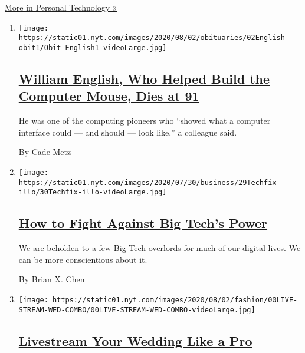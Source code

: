 \href{/section/technology/personaltech}{More in Personal Technology »}

\begin{enumerate}
\def\labelenumi{\arabic{enumi}.}
\item
  \texttt{[image: https://static01.nyt.com/images/2020/08/02/obituaries/02English-obit1/Obit-English1-videoLarge.jpg]}

  \hypertarget{william-english-who-helped-build-the-computer-mouse-dies-at-91}{%
  \subsection{\texorpdfstring{\href{/2020/07/31/technology/william-english-who-helped-build-the-computer-mouse-dies-at-91.html}{William
  English, Who Helped Build the Computer Mouse, Dies at
  91}}{William English, Who Helped Build the Computer Mouse, Dies at 91}}\label{william-english-who-helped-build-the-computer-mouse-dies-at-91}}

  He was one of the computing pioneers who ``showed what a computer
  interface could --- and should --- look like,'' a colleague said.

  By Cade Metz
\item
  \texttt{[image: https://static01.nyt.com/images/2020/07/30/business/29Techfix-illo/30Techfix-illo-videoLarge.jpg]}

  \hypertarget{how-to-fight-against-big-techs-power}{%
  \subsection{\texorpdfstring{\href{/2020/07/29/technology/personaltech/big-tech-power-how-to-fight.html}{How
  to Fight Against Big Tech's
  Power}}{How to Fight Against Big Tech's Power}}\label{how-to-fight-against-big-techs-power}}

  We are beholden to a few Big Tech overlords for much of our digital
  lives. We can be more conscientious about it.

  By Brian X. Chen
\item
  \texttt{[image: https://static01.nyt.com/images/2020/08/02/fashion/00LIVE-STREAM-WED-COMBO/00LIVE-STREAM-WED-COMBO-videoLarge.jpg]}

  \hypertarget{livestream-your-wedding-like-a-pro}{%
  \subsection{\texorpdfstring{\href{/2020/07/28/fashion/weddings/livestream-your-wedding-like-a-pro.html}{Livestream
  Your Wedding Like a
  Pro}}{Livestream Your Wedding Like a Pro}}\label{livestream-your-wedding-like-a-pro}}


\end{enumerate}
